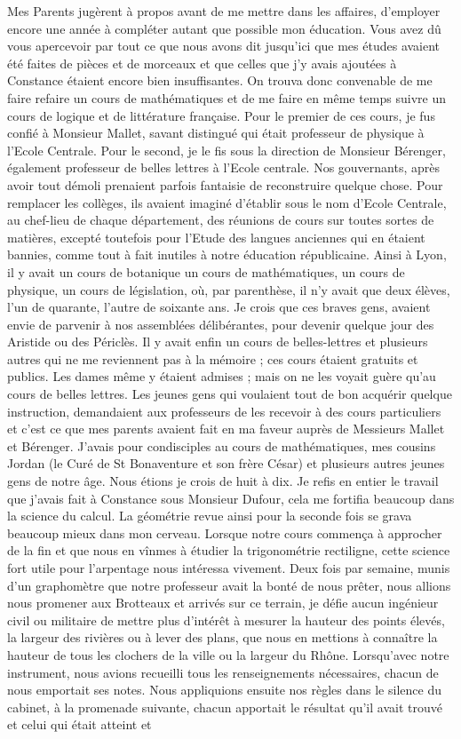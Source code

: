 \documentclass[11pt,a4paper]{report}
\begin{document}
Mes Parents jugèrent à propos avant de me mettre dans les affaires, d'employer encore une année à compléter autant que possible mon éducation. Vous avez dû vous apercevoir par tout ce que nous avons dit jusqu'ici que mes études avaient été faites de pièces et de morceaux et que celles que j'y avais ajoutées à Constance étaient encore bien insuffisantes. On trouva donc convenable de me faire refaire un cours de mathématiques et de me faire en même temps suivre un cours de logique et de littérature française. Pour le premier de ces cours, je fus confié à Monsieur Mallet, savant distingué qui était professeur de physique à l'Ecole Centrale. Pour le second, je le fis sous la direction de Monsieur Bérenger, également professeur de belles lettres à l'Ecole centrale. Nos gouvernants, après avoir tout démoli prenaient parfois fantaisie de reconstruire quelque chose. Pour remplacer les collèges, ils avaient imaginé d'établir sous le nom d'Ecole Centrale, au chef-lieu de chaque département, des réunions de cours sur toutes sortes de matières, excepté toutefois pour l'Etude des langues anciennes qui en étaient bannies, comme tout à fait inutiles à notre éducation républicaine. Ainsi à Lyon, il y avait un cours de botanique un cours de mathématiques, un cours de physique, un cours de législation, où, par parenthèse, il n'y avait que deux élèves, l'un de quarante, l'autre de soixante ans. Je crois que ces braves gens, avaient envie de parvenir à nos assemblées délibérantes, pour devenir quelque jour des Aristide ou des Périclès. Il y avait enfin un cours de belles-lettres et plusieurs autres qui ne me reviennent pas à la mémoire ; ces cours étaient gratuits et publics. Les dames même y étaient admises ; mais on ne les voyait guère qu'au cours de belles lettres. Les jeunes gens qui voulaient tout de bon acquérir quelque instruction, demandaient aux professeurs de les recevoir à des cours particuliers et c'est ce que mes parents avaient fait en ma faveur auprès de Messieurs Mallet et Bérenger. J'avais pour condisciples au cours de mathématiques, mes cousins Jordan (le Curé de St Bonaventure et son frère César) et plusieurs autres jeunes gens de notre âge. Nous étions je crois de huit à dix. Je refis en entier le travail que j'avais fait à Constance sous Monsieur Dufour, cela me fortifia beaucoup dans la science du calcul. La géométrie revue ainsi pour la seconde fois se grava beaucoup mieux dans mon cerveau. Lorsque notre cours commença à approcher de la fin et que nous en vînmes à étudier la trigonométrie rectiligne, cette science fort utile pour l'arpentage nous intéressa vivement. Deux fois par semaine, munis d'un graphomètre que notre professeur avait la bonté de nous prêter, nous allions nous promener aux Brotteaux et arrivés sur ce terrain, je défie aucun ingénieur civil ou militaire de mettre plus d'intérêt à mesurer la hauteur des points élevés, la largeur des rivières ou à lever des plans, que nous en mettions à connaître la hauteur de tous les clochers de la ville ou la largeur du Rhône. Lorsqu'avec notre instrument, nous avions recueilli tous les renseignements nécessaires, chacun de nous emportait ses notes. Nous appliquions ensuite nos règles dans le silence du cabinet, à la promenade suivante, chacun apportait le résultat qu'il avait trouvé et celui qui était atteint et 
\end{document}
